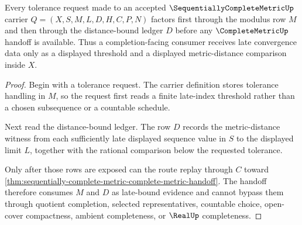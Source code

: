 \begin{theorem}
\label{thm:sequentially-complete-metric-late-bound-coverage}
Every tolerance request made to an accepted $\SequentiallyCompleteMetricUp$ carrier $Q=(X,S,M,L,D,H,C,P,N)$ factors first through the modulus row $M$ and then through the distance-bound ledger $D$ before any $\CompleteMetricUp$ handoff is available. Thus a completion-facing consumer receives late convergence data only as a displayed threshold and a displayed metric-distance comparison inside $X$.
\end{theorem}
\begin{proof}
Begin with a tolerance request. The carrier definition stores tolerance handling in $M$, so the request first reads a finite late-index threshold rather than a chosen subsequence or a countable schedule.

Next read the distance-bound ledger. The row $D$ records the metric-distance witness from each sufficiently late displayed sequence value in $S$ to the displayed limit $L$, together with the rational comparison below the requested tolerance.

Only after those rows are exposed can the route replay through $C$ toward \autoref{thm:sequentially-complete-metric-complete-metric-handoff}. The handoff therefore consumes $M$ and $D$ as late-bound evidence and cannot bypass them through quotient completion, selected representatives, countable choice, open-cover compactness, ambient completeness, or $\RealUp$ completeness.
\end{proof}

